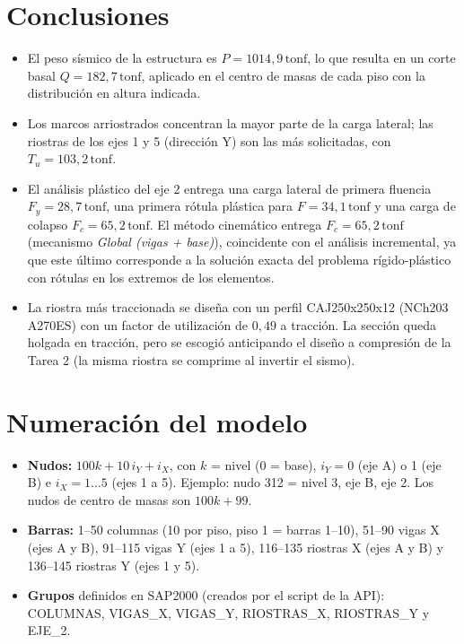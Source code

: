 \documentclass[11pt,letterpaper]{article}
\newcommand{\tonf}{\,\mathrm{tonf}}
\begin{document}
\section{Conclusiones}
\begin{itemize}
  \item El peso sísmico de la estructura es $P = 1014{,}9\tonf$, lo que resulta en un corte
        basal $Q = 182{,}7\tonf$, aplicado en el centro de masas de cada piso con la distribución
        en altura indicada.
  \item Los marcos arriostrados concentran la mayor parte de la carga lateral; las riostras de los ejes 1 y 5
        (dirección Y) son las más solicitadas, con $T_u = 103{,}2\tonf$.
  \item El análisis plástico del eje 2 entrega una carga lateral de primera fluencia
        $F_y = 28{,}7\tonf$, una primera rótula plástica para $F = 34{,}1\tonf$ y
        una carga de colapso $F_c = 65{,}2\tonf$. El método cinemático entrega
        $F_c = 65{,}2\tonf$ (mecanismo \emph{Global (vigas + base)}), coincidente con el
        análisis incremental, ya que este último corresponde a la solución exacta del problema rígido-plástico
        con rótulas en los extremos de los elementos.
  \item La riostra más traccionada se diseña con un perfil CAJ250x250x12 (NCh203 A270ES) con un factor de utilización
        de $0{,}49$ a tracción. La sección queda holgada en tracción, pero se escogió anticipando el
        diseño a compresión de la Tarea 2 (la misma riostra se comprime al invertir el sismo).
\end{itemize}

\appendix
\section{Numeración del modelo}\label{anx:num}
\begin{itemize}
  \item \textbf{Nudos:} $100k + 10\,i_Y + i_X$, con $k$ = nivel (0 = base), $i_Y = 0$ (eje A) o 1 (eje B) e
        $i_X = 1 \dots 5$ (ejes 1 a 5). Ejemplo: nudo 312 = nivel 3, eje B, eje 2. Los nudos de centro de masas
        son $100k + 99$.
  \item \textbf{Barras:} 1--50 columnas (10 por piso, piso 1 = barras 1--10), 51--90 vigas X (ejes A y B),
        91--115 vigas Y (ejes 1 a 5), 116--135 riostras X (ejes A y B) y 136--145 riostras Y (ejes 1 y 5).
  \item \textbf{Grupos} definidos en SAP2000 (creados por el script de la API): COLUMNAS, VIGAS\_X, VIGAS\_Y, RIOSTRAS\_X, RIOSTRAS\_Y y EJE\_2.
\end{itemize}
\end{document}
